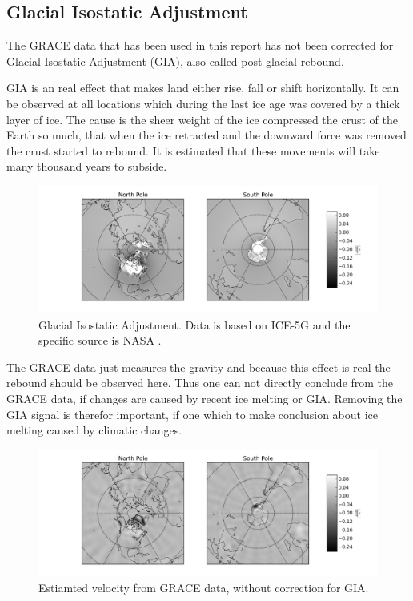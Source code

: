 \subsection{Glacial Isostatic Adjustment}

The GRACE data that has been used in this report has not been corrected for Glacial Isostatic Adjustment (GIA), also called post-glacial rebound.

GIA is an real effect that makes land either rise, fall or shift horizontally. 
It can be observed at all locations which during the last ice age was covered by a thick layer of ice.
The cause is the sheer weight of the ice compressed the crust of the Earth so much, that when the ice retracted and the downward force was removed the crust started to rebound.
It is estimated that these movements will take many thousand years to subside.

\begin{figure}[H]
	\centering
	\includegraphics[width=\textwidth]{figures/gia-pure-adjust}
	\caption{Glacial Isostatic Adjustment. Data is based on ICE-5G and the specific source is NASA \cite{NASA-GIA-download}.}
	\label{fig:gia-pure-adjust}
\end{figure}

The GRACE data just measures the gravity and because this effect is real the rebound should be observed here.
Thus one can not directly conclude from the GRACE data, if changes are caused by recent ice melting or GIA. Removing the GIA signal is therefor important, if one which to make conclusion about ice melting caused by climatic changes.

\begin{figure}[H]
	\centering
	\includegraphics[width=\textwidth]{figures/gia-just-vel}
	\caption{Estiamted velocity from GRACE data, without correction for GIA.}
	\label{fig:gia-just-vel}
\end{figure}

